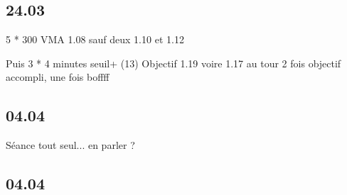 \documentclass{article}
\begin{document}
        
    \subsection{24.03}
        5 * 300 VMA
        1.08 sauf deux 1.10 et 1.12
        
        Puis 3 * 4 minutes seuil+ (13)
        Objectif 1.19 voire 1.17 au tour
        2 fois objectif accompli, une fois boffff
        
        
    \subsection{04.04}
        Séance tout seul... en parler ?
        
        
    \subsection{04.04}
        
\end{document}
